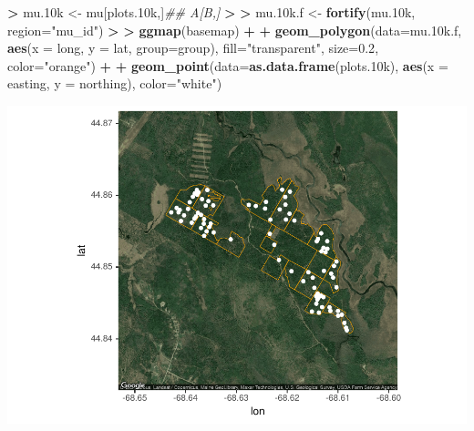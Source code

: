 \documentclass[
]{krantz}
\makeatletter
\newenvironment{Shaded}{\begin{snugshade}}{\end{snugshade}}
\newcommand{\CommentTok}[1]{\textcolor[rgb]{0.37,0.37,0.37}{\textit{#1}}}
\newcommand{\DataTypeTok}[1]{\textcolor[rgb]{0.27,0.27,0.27}{#1}}
\newcommand{\ErrorTok}[1]{\textcolor[rgb]{0.14,0.14,0.14}{\textbf{#1}}}
\newcommand{\FloatTok}[1]{\textcolor[rgb]{0.06,0.06,0.06}{#1}}
\newcommand{\KeywordTok}[1]{\textcolor[rgb]{0.27,0.27,0.27}{\textbf{#1}}}
\newcommand{\NormalTok}[1]{#1}
\newcommand{\OperatorTok}[1]{\textcolor[rgb]{0.43,0.43,0.43}{\textbf{#1}}}
\newcommand{\StringTok}[1]{\textcolor[rgb]{0.5,0.5,0.5}{#1}}
\newenvironment{kframe}{%
\medskip{}
\setlength{\fboxsep}{.8em}
 \def\at@end@of@kframe{}%
 \ifinner\ifhmode%
  \def\at@end@of@kframe{\end{minipage}}%
  \begin{minipage}{\columnwidth}%
 \fi\fi%
 \def\FrameCommand##1{\hskip\@totalleftmargin \hskip-\fboxsep
 \colorbox{shadecolor}{##1}\hskip-\fboxsep
     \hskip-\linewidth \hskip-\@totalleftmargin \hskip\columnwidth}%
 \MakeFramed {\advance\hsize-\width
   \@totalleftmargin\z@ \linewidth\hsize
   \@setminipage}}%
 {\par\unskip\endMakeFramed%
 \at@end@of@kframe}
\renewenvironment{Shaded}{\begin{kframe}}{\end{kframe}}
\makeatother
\begin{document}
\begin{Shaded}
\begin{Highlighting}[]
\OperatorTok{\textgreater{}}\StringTok{ }\NormalTok{mu}\FloatTok{.10}\NormalTok{k \textless{}{-}}\StringTok{ }\NormalTok{mu[plots}\FloatTok{.10}\NormalTok{k,]}\CommentTok{\#\# A[B,]}
\OperatorTok{\textgreater{}}\StringTok{ }
\ErrorTok{\textgreater{}}\StringTok{ }\NormalTok{mu}\FloatTok{.10}\NormalTok{k.f \textless{}{-}}\StringTok{ }\KeywordTok{fortify}\NormalTok{(mu}\FloatTok{.10}\NormalTok{k, }\DataTypeTok{region=}\StringTok{"mu\_id"}\NormalTok{)}
\OperatorTok{\textgreater{}}\StringTok{ }
\ErrorTok{\textgreater{}}\StringTok{ }\KeywordTok{ggmap}\NormalTok{(basemap) }\OperatorTok{+}
\OperatorTok{+}\StringTok{     }\KeywordTok{geom\_polygon}\NormalTok{(}\DataTypeTok{data=}\NormalTok{mu}\FloatTok{.10}\NormalTok{k.f, }\KeywordTok{aes}\NormalTok{(}\DataTypeTok{x =}\NormalTok{ long, }\DataTypeTok{y =}\NormalTok{ lat, }\DataTypeTok{group=}\NormalTok{group), }\DataTypeTok{fill=}\StringTok{"transparent"}\NormalTok{, }\DataTypeTok{size=}\FloatTok{0.2}\NormalTok{, }\DataTypeTok{color=}\StringTok{"orange"}\NormalTok{) }\OperatorTok{+}
\OperatorTok{+}\StringTok{     }\KeywordTok{geom\_point}\NormalTok{(}\DataTypeTok{data=}\KeywordTok{as.data.frame}\NormalTok{(plots}\FloatTok{.10}\NormalTok{k), }\KeywordTok{aes}\NormalTok{(}\DataTypeTok{x =}\NormalTok{ easting, }\DataTypeTok{y =}\NormalTok{ northing), }\DataTypeTok{color=}\StringTok{"white"}\NormalTok{)}
\end{Highlighting}
\end{Shaded}

\includegraphics{bookdown_files/figure-latex/unnamed-chunk-217-1.pdf}
\end{document}
